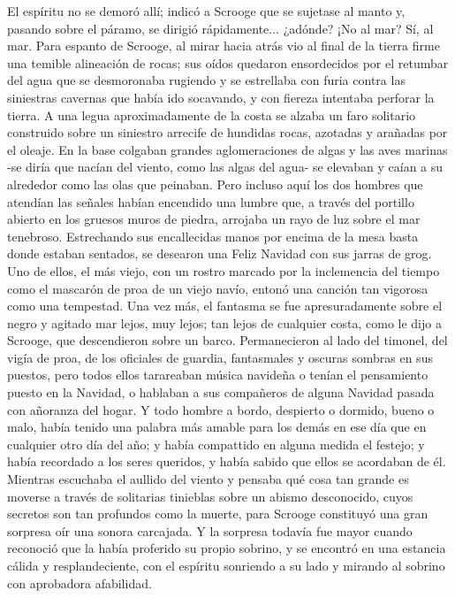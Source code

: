 \documentclass{novela}
\begin{document}
 El espíritu no se demoró allí; indicó a Scrooge que se sujetase al manto y, pasando sobre el páramo, se dirigió rápidamente... ¿adónde? ¡No al mar? Sí, al mar. Para espanto de Scrooge, al mirar hacia atrás vio al final de la tierra firme una temible alineación de rocas; sus oídos quedaron ensordecidos por el retumbar del agua que se desmoronaba rugiendo y se estrellaba con furia contra las siniestras cavernas que había ido socavando, y con fiereza intentaba perforar la tierra.
 A una legua aproximadamente de la costa se alzaba un faro solitario construido sobre un siniestro arrecife de hundidas rocas, azotadas y arañadas por el oleaje. En la base colgaban grandes aglomeraciones de algas y las aves marinas -se diría que nacían del viento, como las algas del agua- se elevaban y caían a su alrededor como las olas que peinaban.
 Pero incluso aquí los dos hombres que atendían las señales habían encendido una lumbre que, a través del portillo abierto en los gruesos muros de piedra, arrojaba un rayo de luz sobre el mar tenebroso. Estrechando sus encallecidas manos por encima de la mesa basta donde estaban sentados, se desearon una Feliz Navidad con sus jarras de grog. Uno de ellos, el más viejo, con un rostro marcado por la inclemencia del tiempo como el mascarón de proa de un viejo navío, entonó una canción tan vigorosa como una tempestad.
 Una vez más, el fantasma se fue apresuradamente sobre el negro y agitado mar lejos, muy lejos; tan lejos de cualquier costa, como le dijo a Scrooge, que descendieron sobre un barco. Permanecieron al lado del timonel, del vigía de proa, de los oficiales de guardia, fantasmales y oscuras sombras en sus puestos, pero todos ellos tarareaban música navideña o tenían el pensamiento puesto en la Navidad, o hablaban a sus compañeros de alguna Navidad pasada con añoranza del hogar. Y todo hombre a bordo, despierto o dormido, bueno o malo, había tenido una palabra más amable para los demás en ese día que en cualquier otro día del año; y había compattido en alguna medida el festejo; y había recordado a los seres queridos, y había sabido que ellos se acordaban de él.
 Mientras escuchaba el aullido del viento y pensaba qué cosa tan grande es moverse a través de solitarias tinieblas sobre un abismo desconocido, cuyos secretos son tan profundos como la muerte, para Scrooge constituyó una gran sorpresa oír una sonora carcajada. Y la sorpresa todavía fue mayor cuando reconoció que la había proferido su propio sobrino, y se encontró en una estancia cálida y resplandeciente, con el espíritu sonriendo a su lado y mirando al sobrino con aprobadora afabilidad.
\end{document}

